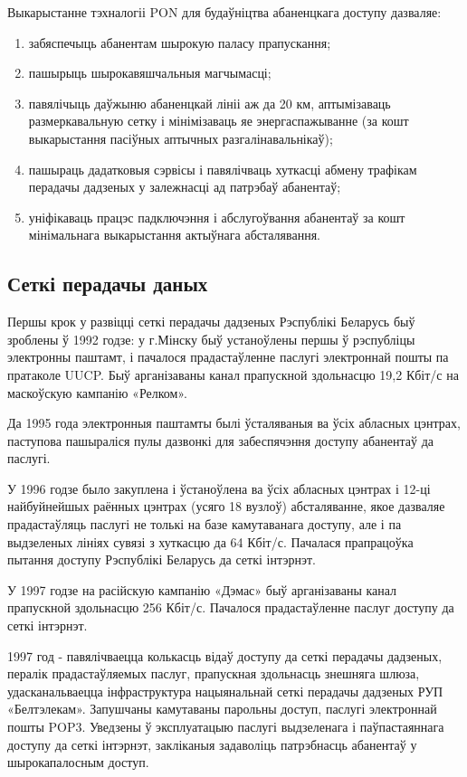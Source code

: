 Выкарыстанне тэхналогіі PON для будаўніцтва абаненцкага доступу дазваляе:
\begin{enumerate}
    \item забяспечыць абанентам шырокую паласу прапускання;
    \item пашырыць шырокавяшчальныя магчымасці;
    \item павялічыць даўжыню абаненцкай лініі аж да 20 км, аптымізаваць размеркавальную сетку і мінімізаваць яе энергаспажыванне (за кошт выкарыстання пасіўных аптычных разгалінавальнікаў);
    \item пашыраць дадатковыя сэрвісы і павялічваць хуткасці абмену трафікам перадачы дадзеных у залежнасці ад патрэбаў абанентаў;
    \item уніфікаваць працэс падключэння і абслугоўвання абанентаў за кошт мінімальнага выкарыстання актыўнага абсталявання.
\end{enumerate}

\subsection{Сеткі перадачы даных}
Першы крок у развіцці сеткі перадачы дадзеных Рэспублікі Беларусь быў зроблены ў 1992 годзе: у г.Мінску быў устаноўлены першы ў рэспубліцы электронны паштамт, і пачалося прадастаўленне паслугі электроннай пошты па пратаколе UUCP. Быў арганізаваны канал прапускной здольнасцю 19,2 Кбіт/с на маскоўскую кампанію «Релком».

Да 1995 года электронныя паштамты былі ўсталяваныя ва ўсіх абласных цэнтрах, паступова пашыраліся пулы дазвонкі для забеспячэння доступу абанентаў да паслугі.

У 1996 годзе было закуплена і ўстаноўлена ва ўсіх абласных цэнтрах і 12-ці найбуйнейшых раённых цэнтрах (усяго 18 вузлоў) абсталяванне, якое дазваляе прадастаўляць паслугі не толькі на базе камутаванага доступу, але і па выдзеленых лініях сувязі з хуткасцю да 64 Кбіт/с. Пачалася прапрацоўка пытання доступу Рэспублікі Беларусь да сеткі інтэрнэт.

У 1997 годзе на расійскую кампанію «Дэмас» быў арганізаваны канал прапускной здольнасцю 256 Кбіт/с. Пачалося прадастаўленне паслуг доступу да сеткі інтэрнэт.

1997 год - павялічваецца колькасць відаў доступу да сеткі перадачы дадзеных, пералік прадастаўляемых паслуг, прапускная здольнасць знешняга шлюза, удасканальваецца інфраструктура нацыянальнай сеткі перадачы дадзеных РУП «Белтэлекам». Запушчаны камутаваны парольны доступ, паслугі электроннай пошты POP3. Уведзены ў эксплуатацыю паслугі выдзеленага і паўпастаяннага доступу да сеткі інтэрнэт, закліканыя задаволіць патрэбнасць абанентаў у шырокапалосным доступ.

